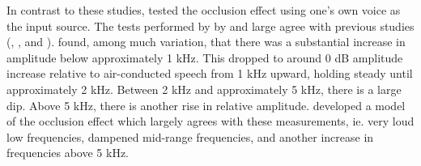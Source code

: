 In contrast to these studies, \cite{hansen:97b} tested the occlusion effect using one's own voice as the input source.  %
%
%
The tests performed by \cite{hansen:97b} %
by and large agree with %
previous studies (\cite{wimmer:86}, \cite{may:92}, and \cite{thorup:96}).  \cite{hansen:97b} found, among much variation, that there was a substantial increase in amplitude below approximately 1 kHz.  This dropped to around 0 dB amplitude increase relative to air-conducted speech from 1 kHz upward, holding steady until approximately 2 kHz.  Between 2 kHz and approximately 5 kHz, there is a large dip.  Above 5 kHz, there is another rise in relative amplitude.  \cite{hansen:97b} developed a model of the occlusion effect which largely agrees with these measurements, ie. very loud low frequencies, dampened mid-range frequencies, and another increase in frequencies above 5 kHz.

